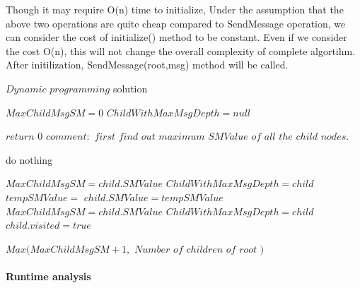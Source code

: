 Though it may require O(n) time to initialize, Under the assumption that the above two operations are quite cheap compared to SendMessage operation, we can consider the cost of initialize() method to be constant. Even if we consider the cost O(n), this will not change the overall complexity of complete algortihm. \\

After initilization, SendMessage(root,msg) method will be called. 




\begin{algorithm}
	\caption{$Dynamic $ $programming$ solution}
	\begin{algorithmic}
		\State $ MaxChildMsgSM = 0 $
		\State $ ChildWithMaxMsgDepth = null $
		
			\State $ return$ $ 0$ 	
		\EndIf
	  	\State 		
		\State $comment: $ $ first $ $ find $ $ out $ $ maximum $ $ SMValue $  $ of $ $ all $ $ the $ $ child $ $ nodes.$		
		
		
		\State 
			\State do nothing
		\Else
		\State		
		
			 \State			 
				\State			 	
			 	\State $ MaxChildMsgSM = child.SMValue$
				\State $ ChildWithMaxMsgDepth = child $
			  \EndIf
				\State
	     \Else
	     \State
		    \State 	
	     	\State $tempSMValue =  $ 
	     	\State $child.SMValue = tempSMValue$
				\State			 	
			 	\State $ MaxChildMsgSM = child.SMValue$
				\State $ ChildWithMaxMsgDepth = child $
				\State $ child.visited = true $
				\State
			\EndIf
			\State
		\EndIf		
		\State
		\EndIf
		\State
		\EndIf
		\State	
		\EndFor
		
		
		
		\Return $ Max(MaxChildMsgSM + 1,$ $ Number$ $ of $ $ children $ $ of $ $ root $ $ ) $
			 				
		
		
	  \EndFunction
	
	  
	\end{algorithmic}
\end{algorithm}

\paragraph{Runtime analysis}

